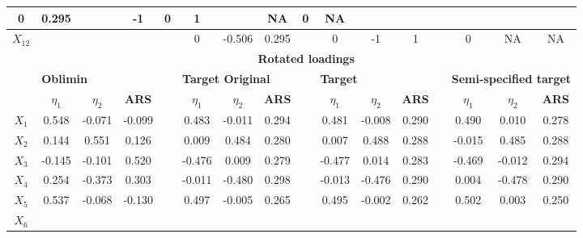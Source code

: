 \documentclass[a4paper,man,natbib]{apa6}
\begin{document}
\begin{linenumbers}
\begin{table}[]
\begin{adjustbox}{width = 0.9\textwidth}
\begin{tabular}{cccccccccccccccc}
		\multicolumn{1}{c}{0} &
		\multicolumn{1}{c}{0.295} &
		&
		\multicolumn{1}{c}{-1} &
		\multicolumn{1}{c}{0} &
		\multicolumn{1}{c}{1} &
		&
		\multicolumn{1}{c}{NA} &
		\multicolumn{1}{c}{0} &
		\multicolumn{1}{c}{NA} \\ \hline
		\textbf{$X_{12}$} &
		&
		&
		&
		&
		\multicolumn{1}{c}{0} &
		\multicolumn{1}{c}{-0.506} &
		\multicolumn{1}{c}{0.295} &
		&
		\multicolumn{1}{c}{0} &
		\multicolumn{1}{c}{-1} &
		\multicolumn{1}{c}{1} &
		&
		\multicolumn{1}{c}{0} &
		\multicolumn{1}{c}{NA} &
		\multicolumn{1}{c}{NA} \\ \hline
		&
		\multicolumn{15}{c}{\textbf{Rotated loadings}} \\ \hline
		&
		\multicolumn{3}{l}{\textbf{Oblimin}} &
		\textbf{} &
		\multicolumn{3}{l}{\textbf{Target Original}} &
		\textbf{} &
		\multicolumn{3}{l}{\textbf{Target}} &
		\textbf{} &
		\multicolumn{3}{l}{\textbf{Semi-specified target}} \\ \hline
		&
		\multicolumn{1}{c}{\textbf{$\eta_{1}$}} &
		\multicolumn{1}{c}{\textbf{$\eta_{2}$}} &
		\multicolumn{1}{c}{\textbf{ARS}} &
		&
		\multicolumn{1}{c}{\textbf{$\eta_{1}$}} &
		\multicolumn{1}{c}{\textbf{$\eta_{2}$}} &
		\multicolumn{1}{c}{\textbf{ARS}} &
		&
		\multicolumn{1}{c}{\textbf{$\eta_{1}$}} &
		\multicolumn{1}{c}{\textbf{$\eta_{2}$}} &
		\multicolumn{1}{c}{\textbf{ARS}} &
		&
		\multicolumn{1}{c}{\textbf{$\eta_{1}$}} &
		\multicolumn{1}{c}{\textbf{$\eta_{2}$}} &
		\multicolumn{1}{c}{\textbf{ARS}} \\ \hline
		\textbf{$X_{1}$} &
		0.548 &
		-0.071 &
		-0.099 &
		&
		0.483 &
		-0.011 &
		0.294 &
		&
		0.481 &
		-0.008 &
		0.290 &
		&
		0.490 &
		0.010 &
		0.278 \\ \hline
		\textbf{$X_{2}$} &
		0.144 &
		0.551 &
		0.126 &
		&
		0.009 &
		0.484 &
		0.280 &
		&
		0.007 &
		0.488 &
		0.288 &
		&
		-0.015 &
		0.485 &
		0.288 \\ \hline
		\textbf{$X_{3}$} &
		-0.145 &
		-0.101 &
		0.520 &
		&
		-0.476 &
		0.009 &
		0.279 &
		&
		-0.477 &
		0.014 &
		0.283 &
		&
		-0.469 &
		-0.012 &
		0.294 \\ \hline
		\textbf{$X_{4}$} &
		0.254 &
		-0.373 &
		0.303 &
		&
		-0.011 &
		-0.480 &
		0.298 &
		&
		-0.013 &
		-0.476 &
		0.290 &
		&
		0.004 &
		-0.478 &
		0.290 \\ \hline
		\textbf{$X_{5}$} &
		0.537 &
		-0.068 &
		-0.130 &
		&
		0.497 &
		-0.005 &
		0.265 &
		&
		0.495 &
		-0.002 &
		0.262 &
		&
		0.502 &
		0.003 &
		0.250 \\ \hline
		\textbf{$X_{6}$} &

\end{tabular}
\end{adjustbox}
\end{table}
\end{linenumbers}
\end{document}
